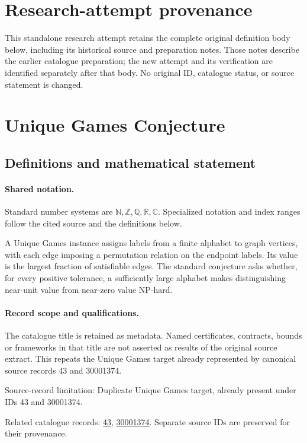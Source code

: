 \documentclass[11pt]{article}
\begin{document}
\section*{Research-attempt provenance}
This standalone research attempt retains the complete original definition body below,
including its historical source and preparation notes. Those notes describe the
earlier catalogue preparation; the new attempt and its verification are identified
separately after that body. No original ID, catalogue status, or source statement is changed.

\section{Unique Games Conjecture}\label{statement}

\subsection{Definitions and mathematical statement}

\paragraph{Shared notation.}Standard number systems are $\mathbb N,\mathbb Z,\mathbb Q,\mathbb R,\mathbb C$. Specialized notation and index ranges follow the cited source and the definitions below.


A Unique Games instance assigns labels from a finite alphabet to graph vertices, with each edge imposing a permutation relation on the endpoint labels. Its value is the largest fraction of satisfiable edges. The standard conjecture asks whether, for every positive tolerance, a sufficiently large alphabet makes distinguishing near-unit value from near-zero value NP-hard.
\paragraph{Record scope and qualifications.}
The catalogue title is retained as metadata. Named certificates, contracts, bounds or frameworks in that title are not asserted as results of the original source extract.
This repeats the Unique Games target already represented by canonical source records 43 and 30001374.

Source-record limitation: Duplicate Unique Games target, already present under IDs 43 and 30001374.

Related catalogue records: \href{https://mehmetmars7.github.io/Erdosproblems-llm-hunter/problem.html?type=open_problems&id=43}{43}, \href{https://mehmetmars7.github.io/Erdosproblems-llm-hunter/problem.html?type=open_problems&id=30001374}{30001374}. Separate source IDs are preserved for their provenance.
\end{document}
